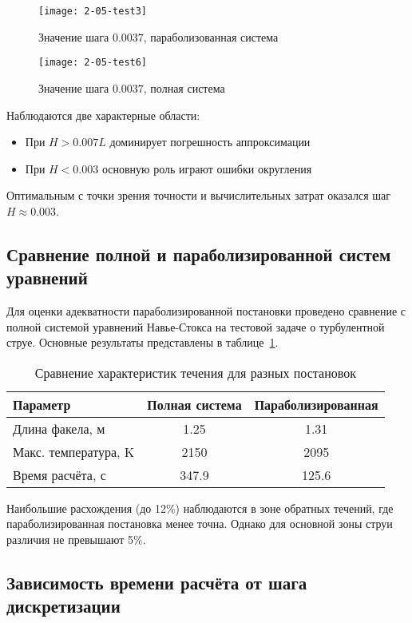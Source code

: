 \begin{figure}
    \texttt{[image: 2-05-test3]}
    \caption{Значение шага $0.0037$, параболизованная система}
    \label{fig:acc_3_1}
\end{figure}

\begin{figure}
    \texttt{[image: 2-05-test6]}
    \caption{Значение шага $0.0037$, полная система}
    \label{fig:acc_3_2}
\end{figure}

Наблюдаются две характерные области:

\begin{itemize}
\item При $H > 0.007L$ доминирует погрешность аппроксимации
\item При $H < 0.003$ основную роль играют ошибки округления
\end{itemize}

Оптимальным с точки зрения точности и вычислительных затрат оказался шаг $H \approx 0.003$.

\subsection{Сравнение полной и параболизированной систем уравнений}

Для оценки адекватности параболизированной постановки проведено сравнение с полной системой уравнений Навье-Стокса на тестовой задаче о турбулентной струе. Основные результаты представлены в таблице~\ref{tab:comparison}.

\begin{table}[h]
\centering
\caption{Сравнение характеристик течения для разных постановок}
\label{tab:comparison}
    \begin{tabular}{|l|c|c|}
    \hline
    Параметр & Полная система & Параболизированная \\ \hline
    Длина факела, м & 1.25 & 1.31 \\ 
    Макс. температура, K & 2150 & 2095 \\
    Время расчёта, с & 347.9 & 125.6 \\ \hline
    \end{tabular}
\end{table}

Наибольшие расхождения (до 12\%) наблюдаются в зоне обратных течений, где параболизированная постановка менее точна. Однако для основной зоны струи различия не превышают 5\%.

\subsection{Зависимость времени расчёта от шага дискретизации}
\label{subsec:performance}

